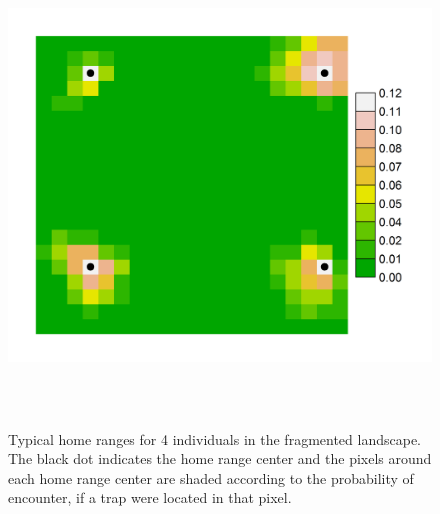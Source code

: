 \documentclass[12pt]{article}
\begin{document}
\begin{figure}
\begin{center}
\includegraphics[height=5in,width=6in]{figs/home_rangesv2}
\end{center}
\caption{
Typical home ranges for 4 individuals in the fragmented landscape. %
The black dot indicates the home
  range center and the pixels around each home range center are shaded
according to the probability of encounter, if a trap were located in
that pixel.
}
\label{fig.homeranges}
\end{figure}

\clearpage
\newpage
\end{document}
